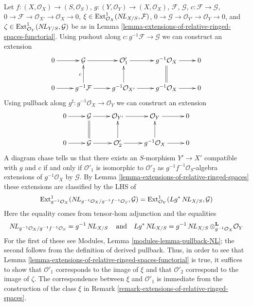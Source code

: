 \begin{remark}
\label{remark-extensions-of-relative-ringed-spaces-functorial}
Let $f : (X, \mathcal{O}_X) \to (S, \mathcal{O}_S)$,
$g : (Y, \mathcal{O}_Y) \to (X, \mathcal{O}_X)$,
$\mathcal{F}$,
$\mathcal{G}$,
$c : \mathcal{F} \to \mathcal{G}$,
$0 \to \mathcal{F} \to \mathcal{O}_{X'} \to \mathcal{O}_X \to 0$,
$\xi \in \mathop{\mathrm{Ext}}\nolimits^1_{\mathcal{O}_X}(\mathop{N\!L}\nolimits_{X/S}, \mathcal{F})$,
$0 \to \mathcal{G} \to \mathcal{O}_{Y'} \to \mathcal{O}_Y \to 0$,
and $\zeta \in \mathop{\mathrm{Ext}}\nolimits^1_{\mathcal{O}_Y}(\mathop{N\!L}\nolimits_{Y/S}, \mathcal{G})$
be as in Lemma \ref{lemma-extensions-of-relative-ringed-spaces-functorial}.
Using pushout along $c : g^{-1}\mathcal{F} \to \mathcal{G}$
we can construct an extension
$$
\xymatrix{
0 \ar[r] &
\mathcal{G} \ar[r] &
\mathcal{O}'_1 \ar[r] &
g^{-1}\mathcal{O}_X \ar[r] & 0 \\
0 \ar[r] &
g^{-1}\mathcal{F} \ar[u]^c \ar[r] &
g^{-1}\mathcal{O}_{X'} \ar[u] \ar[r] &
g^{-1}\mathcal{O}_X \ar@{=}[u] \ar[r] & 0
}
$$
Using pullback along
$g^\sharp : g^{-1}\mathcal{O}_X \to \mathcal{O}_Y$
we can construct an extension
$$
\xymatrix{
0 \ar[r] &
\mathcal{G} \ar[r] &
\mathcal{O}_{Y'} \ar[r] &
\mathcal{O}_Y \ar[r] & 0 \\
0 \ar[r] &
\mathcal{G} \ar@{=}[u] \ar[r] &
\mathcal{O}'_2 \ar[u] \ar[r] &
g^{-1}\mathcal{O}_X \ar[u] \ar[r] & 0
}
$$
A diagram chase tells us that there exists an $S$-morphism $Y' \to X'$
compatible with $g$ and $c$ if and only if $\mathcal{O}'_1$ is isomorphic
to $\mathcal{O}'_2$ as $g^{-1}f^{-1}\mathcal{O}_S$-algebra extensions
of $g^{-1}\mathcal{O}_X$ by $\mathcal{G}$. By
Lemma \ref{lemma-extensions-of-relative-ringed-spaces}
these extensions are classified by the LHS of
$$
\mathop{\mathrm{Ext}}\nolimits^1_{g^{-1}\mathcal{O}_X}(
\mathop{N\!L}\nolimits_{g^{-1}\mathcal{O}_X/g^{-1}f^{-1}\mathcal{O}_S}, \mathcal{G}) =
\mathop{\mathrm{Ext}}\nolimits^1_{\mathcal{O}_Y}(Lg^*\mathop{N\!L}\nolimits_{X/S}, \mathcal{G})
$$
Here the equality comes from tensor-hom adjunction and
the equalities
$$
\mathop{N\!L}\nolimits_{g^{-1}\mathcal{O}_X/g^{-1}f^{-1}\mathcal{O}_S} = g^{-1}\mathop{N\!L}\nolimits_{X/S}
\quad\text{and}\quad
Lg^*\mathop{N\!L}\nolimits_{X/S} =
g^{-1}\mathop{N\!L}\nolimits_{X/S} \otimes_{g^{-1}\mathcal{O}_X}^\mathbf{L} \mathcal{O}_Y
$$
For the first of these see
Modules, Lemma \ref{modules-lemma-pullback-NL}; the second
follows from the definition of derived pullback.
Thus, in order to see that
Lemma \ref{lemma-extensions-of-relative-ringed-spaces-functorial}
is true, it suffices to show that $\mathcal{O}'_1$ corresponds
to the image of $\xi$ and that $\mathcal{O}'_2$ correspond to
the image of $\zeta$.
The correspondence between $\xi$ and $\mathcal{O}'_1$
is immediate from the construction of the class $\xi$ in
Remark \ref{remark-extensions-of-relative-ringed-spaces}.

\end{remark}
